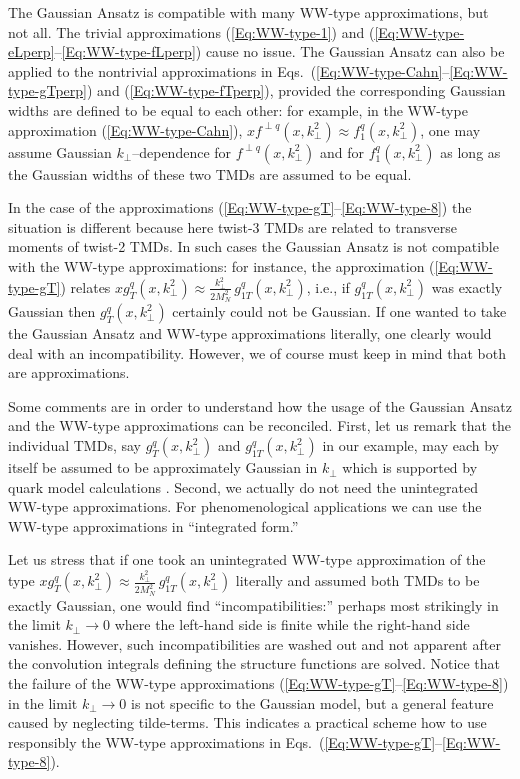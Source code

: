 \documentclass[a4paper,11pt]{article}
\def\kperp{k_\perp}
\begin{document}
The Gaussian Ansatz is compatible with many WW-type approximations,
but not all. The trivial approximations (\ref{Eq:WW-type-1}) and
(\ref{Eq:WW-type-eLperp}--\ref{Eq:WW-type-fLperp}) cause no issue. 
The Gaussian Ansatz can also be applied to the nontrivial approximations 
in Eqs.~(\ref{Eq:WW-type-Cahn}--\ref{Eq:WW-type-gTperp})
and (\ref{Eq:WW-type-fTperp}), provided the corresponding Gaussian 
widths are defined to be equal to each other: for example, in the 
WW-type approximation (\ref{Eq:WW-type-Cahn}),
$xf^{\perp q}(x,\kperp^2)\approx f_1^q(x,\kperp^2)$, one may 
assume Gaussian $\kperp$--dependence for $f^{\perp q}(x,\kperp^2)$ 
and for $f_1^q(x,\kperp^2)$ as long as the Gaussian widths
of these two TMDs are assumed to be equal.

In the case of the approximations 
(\ref{Eq:WW-type-gT}--\ref{Eq:WW-type-8})
the situation is different because here twist-3 TMDs
are related to transverse moments of twist-2 TMDs. In such cases the 
Gaussian Ansatz is not compatible with the WW-type approximations:
for instance, the approximation (\ref{Eq:WW-type-gT}) relates
$xg_T^q(x,\kperp^2)\approx\frac{k_\perp^2}{2M_N^2}\,g_{1T}^{q}(x,\kperp^2)$,
i.e., if $g_{1T}^q(x,\kperp^2)$ was exactly Gaussian then 
$g_T^q(x,\kperp^2)$ certainly could not be Gaussian. If one wanted to take
the Gaussian Ansatz and WW-type approximations literally, one clearly
would deal with an incompatibility. However, we of course must keep 
in mind that both are approximations. 

Some comments are in order to understand how the usage of the Gaussian 
Ansatz and the WW-type approximations can be reconciled.
First, let us remark that the individual TMDs, say 
$g_T^q(x,\kperp^2)$ and $g_{1T}^{q}(x,\kperp^2)$ in our example,
may each by itself be assumed to be approximately Gaussian in $k_\perp$
which is supported by quark model calculations \cite{Avakian:2010br}.
Second, we actually do not need the unintegrated WW-type approximations. 
For phenomenological applications we can use the WW-type approximations 
in ``integrated form.'' 

Let us stress that if one took an unintegrated WW-type approximation of the 
type $xg_T^q(x,\kperp^2)\approx\frac{k_\perp^2}{2M_N^2}\,g_{1T}^{q}(x,\kperp^2)$
literally and assumed both TMDs to be exactly Gaussian, one would find
``incompatibilities:'' perhaps most strikingly in the limit $k_\perp\to 0$
where the left-hand side is finite while the right-hand side vanishes.
However, such incompatibilities are washed out and not apparent after
the convolution integrals defining the structure functions are solved.
Notice that the failure of the WW-type approximations
(\ref{Eq:WW-type-gT}--\ref{Eq:WW-type-8}) in the limit $k_\perp\to 0$ is 
not specific to the Gaussian model,
but a general feature caused by neglecting tilde-terms. This indicates 
a practical scheme how to use responsibly the WW-type approximations in 
Eqs.~(\ref{Eq:WW-type-gT}--\ref{Eq:WW-type-8}).
\end{document}
